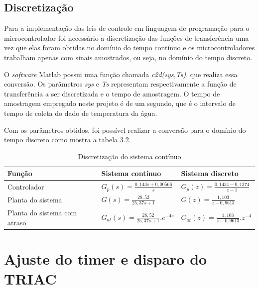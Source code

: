 \subsection{Discretização}

Para a implementação das leis de controle em linguagem de programação para o microcontrolador foi necessário a discretização das funções de transferência uma vez que elas foram obtidas no domínio do tempo contínuo e os microcontroladores trabalham apenas com sinais amostrados, ou seja, no domínio do tempo discreto.

O \textit{software} Matlab possui uma função chamada \textit{c2d(sys,Ts)}, que realiza essa conversão. Os parâmetros \textit{sys}  e \textit{Ts} representam respectivamente a função de transferência a ser discretizada e o tempo de amostragem. O tempo de amostragem empregado neste projeto é de um segundo, que é o intervalo de tempo de coleta do dado de temperatura da água.

Com os parâmetros obtidos, foi possível realizar a conversão para o domínio do tempo discreto como mostra a tabela 3.2.


\begin{table}[!hbt] 
   \centering   %
   \setlength{\arrayrulewidth}{1\arrayrulewidth}
   \setlength{\belowcaptionskip}{5pt}
   
   \renewcommand{\arraystretch}{2}
   
   \caption{Discretização do sistema contínuo}
   \begin{tabular}{|l|l|l|} %
      \hline
      \textbf{Função} &\textbf{Sistema contínuo} & \textbf{Sistema discreto} \\
      \hline 
      Controlador & $G_p(s) = \frac{0,143 s + 0,00566}{s}$ &  $G_p(z) = \frac{0,143z-0,1374}{z-1}$ \\ 
     \hline
     
     
      Planta do sistema & $G(s) = \frac{28,52}{25,37s+1}$  & $G(z) = \frac{1,103}{z - 0,9613}$ \\
      
      
      \hline 
      Planta do sistema com atraso &$G_{at}(s) = \frac{28,52}{25,37s+1}.e^{-4s}$ & $G_{at}(z) = \frac{1,103}{z - 0,9613}.z^{-4}$ \\  
      \hline 
   \end{tabular}
   \label{Discretização do sistema contínuo}
\end{table}

\section{Ajuste do timer e disparo do TRIAC}

